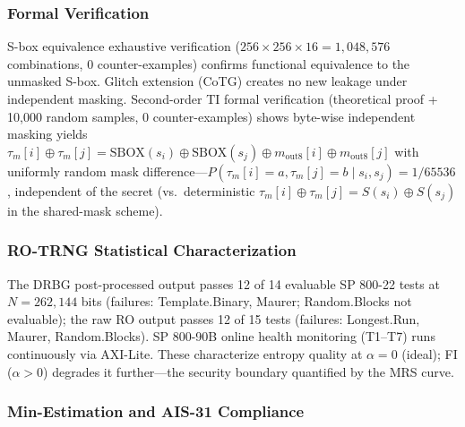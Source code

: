 \documentclass[journal]{IEEEtran}
\begin{document}
\subsubsection{Formal Verification}

S-box equivalence exhaustive verification ($256 \times 256 \times 16 = 1{,}048{,}576$ combinations, 0 counter-examples) confirms functional equivalence to the unmasked S-box. Glitch extension (CoTG) creates no new leakage under independent masking. Second-order TI formal verification (theoretical proof + 10,000 random samples, 0 counter-examples) shows byte-wise independent masking yields $\tau_m[i] \oplus \tau_m[j] = \text{SBOX}(s_i) \oplus \text{SBOX}(s_j) \oplus m_{\text{out8}}[i] \oplus m_{\text{out8}}[j]$ with uniformly random mask difference---$P(\tau_m[i]=a, \tau_m[j]=b \mid s_i, s_j) = 1/65536$, independent of the secret (vs.\ deterministic $\tau_m[i]\oplus\tau_m[j]=S(s_i)\oplus S(s_j)$ in the shared-mask scheme).

\subsubsection{RO-TRNG Statistical Characterization}

The DRBG post-processed output passes 12 of 14 evaluable SP 800-22 tests at $N=262{,}144$ bits (failures: Template.Binary, Maurer; Random.Blocks not evaluable); the raw RO output passes 12 of 15 tests (failures: Longest.Run, Maurer, Random.Blocks). SP 800-90B online health monitoring (T1--T7) runs continuously via AXI-Lite. These characterize entropy quality at $\alpha=0$ (ideal); FI ($\alpha>0$) degrades it further---the security boundary quantified by the MRS curve.

\subsubsection{Min-Estimation and AIS-31 Compliance}

\begin{table}[t]
\renewcommand{\arraystretch}{1.1}
\caption{Min-Entropy Estimation Results}
\label{tab:min-entropy}
\end{table}
\end{document}
